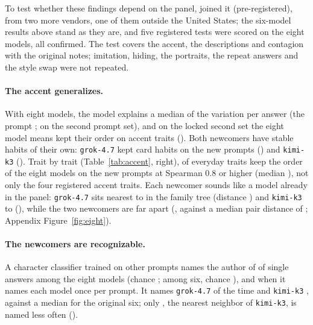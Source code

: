 \documentclass[11pt]{article}
\begin{document}
To test whether these findings depend on the panel, \pEightNew{} joined it (pre-registered), from two more vendors, one of them outside the United States; the six-model results above stand as they are, and five registered tests were scored on the eight models, all confirmed.
The test covers the accent, the descriptions and contagion with the original notes; imitation, hiding, the portraits, the repeat answers and the style swap were not repeated.

\paragraph{The accent generalizes.}
With eight models, the model explains a median \pEightMedModel{} of the variation per answer (the prompt \pEightMedPrompt; \pEightMedModelTwo{} on the second prompt set), and on the locked second set the eight model means kept their order on \pEightGOnePass{} accent traits (\pEightGOneList).
Both newcomers have stable habits of their own: \texttt{grok-4.7} kept \pEightCardKeptGrok{} card habits on the new prompts (\pEightCardGrok) and \texttt{kimi-k3} \pEightCardKeptKimi{} (\pEightCardKimi).
Trait by trait (Table~\ref{tab:accent}, right), \pEightRtHigh{} of \pEightRtN{} everyday traits keep the order of the eight models on the new prompts at Spearman 0.8 or higher (median \pEightRtMedian), not only the four registered accent traits.
Each newcomer sounds like a model already in the panel: \texttt{grok-4.7} sits nearest to \pEightNearGrok{} in the family tree (distance \pEightNearGrokDist) and \texttt{kimi-k3} to \pEightNearKimi{} (\pEightNearKimiDist), while the two newcomers are far apart (\pEightNewPairDist, against a median pair distance of \pEightMedianPair; Appendix Figure~\ref{fig:eight}).

\paragraph{The newcomers are recognizable.}
A character classifier trained on other prompts names the author of \charEightAcc{} of single answers among the eight models (chance \chanceEight; \abOriginal{} among six, chance \chance), and \charEightMatched{} when it names each model once per prompt.
It names \texttt{grok-4.7} \charEightGrok{} of the time and \texttt{kimi-k3} \charEightKimi, against a median \charEightSixMedian{} for the original six; only \pEightNearKimi, the nearest neighbor of \texttt{kimi-k3}, is named less often (\charEightBelowKimi).
\end{document}
